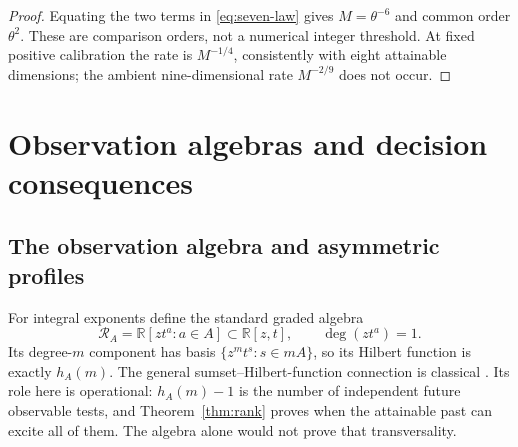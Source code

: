 \documentclass[11pt]{amsart}
\theoremstyle{definition}\newtheorem{definition}[theorem]{Definition}
\theoremstyle{remark}\newtheorem{remark}[theorem]{Remark}
\newcommand{\R}{\mathbb R}\newcommand{\N}{\mathbb N}\newcommand{\C}{\mathbb C}
\begin{document}
\begin{proof}
Equating the two terms in \eqref{eq:seven-law} gives
$M=\theta^{-6}$ and common order $\theta^2$. These are comparison
orders, not a numerical integer threshold. At fixed positive calibration
the rate is $M^{-1/4}$, consistently with eight attainable dimensions;
the ambient nine-dimensional rate $M^{-2/9}$ does not occur.
\end{proof}

\endgroup
\section{Observation algebras and decision consequences}
\label{app:decisions}
\begingroup
\let\section\subsection
\let\subsection\subsubsection
\let\subsubsection\paragraph
\section{The observation algebra and asymmetric profiles}\label{sec:algebra}
For integral exponents define the standard graded algebra
\[
 \mathcal R_A=\R[z t^a:a\in A]\subset\R[z,t],\qquad \deg(zt^a)=1.
\]
Its degree-$m$ component has basis $\{z^m t^s:s\in mA\}$, so its
Hilbert function is exactly $h_A(m)$. The general sumset--Hilbert-function
connection is classical \cite{EliahouMazumdar,Elias}. Its role here is
operational: $h_A(m)-1$ is the number of independent future observable
tests, and Theorem~\ref{thm:rank} proves when the attainable past can
excite all of them. The algebra alone would not prove that transversality.
\end{document}
